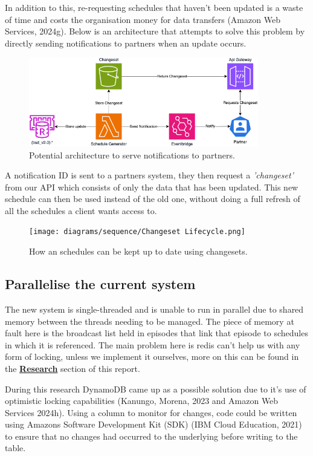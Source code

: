 In addition to this, re-requesting schedules that haven't been updated is a waste of time and costs the organisation money for data 
transfers (Amazon Web Services, 2024g). Below is an architecture that attempts to solve this problem by directly sending notifications to 
partners when an update occurs.

\begin{figure}[H]
  \centering
  \includegraphics[width=10cm]{assets/architectures/changesets.drawio.png}
  \caption{Potential architecture to serve notifications to partners.}
  \label{fig:changsetArchitecture}
\end{figure}

A notification ID is sent to a partners system, they then request a \textit{'changeset'} from our API which consists of only the data that has been updated.
This new schedule can then be used instead of the old one, without doing a full refresh of all the schedules a client wants access to.

\begin{figure}[H]
  \centering
  \texttt{[image: diagrams/sequence/Changeset Lifecycle.png]}
  \caption{How an schedules can be kept up to date using changesets.}
  \label{fig:changsetLifecycle}
\end{figure}

\newpage
\subsection{Parallelise the current system}
The new system is single-threaded and is unable to run in parallel due to shared memory between the threads needing to be managed. The piece of memory
at fault here is the broadcast list held in episodes that link that episode to schedules in which it is referenced. The main problem here is redis 
can't help us with any form of locking, unless we implement it ourselves, more on this can be found in the \hyperref[sec:storageSolutions]{\textbf{Research}}
section of this report.

During this research DynamoDB came up as a possible solution due to it's use of optimistic locking capabilities 
(Kanungo, Morena, 2023 and Amazon Web Services 2024h). Using a column to monitor for changes, code could be written using Amazons Software Development
Kit (SDK) (IBM Cloud Education, 2021) to ensure that no changes had occurred to the underlying before writing to the table. 

